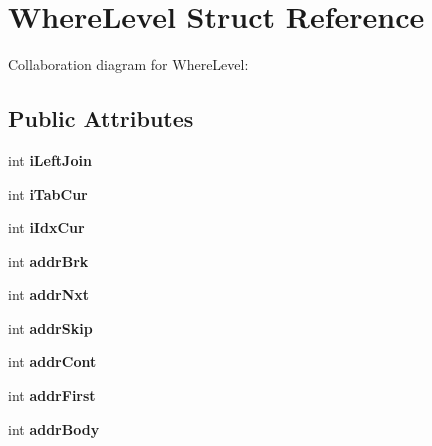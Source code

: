 \hypertarget{structWhereLevel}{}\section{Where\+Level Struct Reference}
\label{structWhereLevel}


Collaboration diagram for Where\+Level\+:
\subsection*{Public Attributes}
\begin{DoxyCompactItemize}
\item 
int {\bfseries i\+Left\+Join}\hypertarget{structWhereLevel_a600072864f71c568cabcbb6140f6955a}{}\label{structWhereLevel_a600072864f71c568cabcbb6140f6955a}

\item 
int {\bfseries i\+Tab\+Cur}\hypertarget{structWhereLevel_aa31c27c3304de936a6ce974450c55592}{}\label{structWhereLevel_aa31c27c3304de936a6ce974450c55592}

\item 
int {\bfseries i\+Idx\+Cur}\hypertarget{structWhereLevel_a0733f34c7987c721351ab0001d4b1dd9}{}\label{structWhereLevel_a0733f34c7987c721351ab0001d4b1dd9}

\item 
int {\bfseries addr\+Brk}\hypertarget{structWhereLevel_a06f788bd4109f394d162250af9582e45}{}\label{structWhereLevel_a06f788bd4109f394d162250af9582e45}

\item 
int {\bfseries addr\+Nxt}\hypertarget{structWhereLevel_ab4b748f1fa2ec727f00ca42d9df60144}{}\label{structWhereLevel_ab4b748f1fa2ec727f00ca42d9df60144}

\item 
int {\bfseries addr\+Skip}\hypertarget{structWhereLevel_ae7fa600bc2de02c08095ae310e69e594}{}\label{structWhereLevel_ae7fa600bc2de02c08095ae310e69e594}

\item 
int {\bfseries addr\+Cont}\hypertarget{structWhereLevel_a493d44d8f3b53d4d47191d751f8a9a94}{}\label{structWhereLevel_a493d44d8f3b53d4d47191d751f8a9a94}

\item 
int {\bfseries addr\+First}\hypertarget{structWhereLevel_a2d87c8fb787ca4111d7ab38a838325a8}{}\label{structWhereLevel_a2d87c8fb787ca4111d7ab38a838325a8}

\item 
int {\bfseries addr\+Body}\hypertarget{structWhereLevel_aa5e7bf3c8aa96edc0e65b7e669bfd49b}{}\label{structWhereLevel_aa5e7bf3c8aa96edc0e65b7e669bfd49b}


\end{DoxyCompactItemize}
